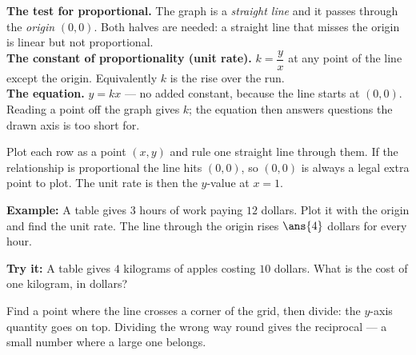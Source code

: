 \documentclass[12pt]{article}
\begin{document}

\begin{formulabox}
\textbf{The test for proportional.} The graph is a \emph{straight line} and it
passes through the \emph{origin} $(0,0)$. Both halves are needed: a straight
line that misses the origin is linear but not proportional.\\[3pt]
\textbf{The constant of proportionality (unit rate).}
$k = \dfrac{y}{x}$ at any point of the line except the origin. Equivalently
$k$ is the rise over the run.\\[3pt]
\textbf{The equation.} $y = kx$ --- no added constant, because the line starts
at $(0,0)$. Reading a point off the graph gives $k$; the equation then answers
questions the drawn axis is too short for.
\end{formulabox}


\begin{formulabox}
Plot each row as a point $(x, y)$ and rule one straight line through them.
If the relationship is proportional the line hits $(0,0)$, so $(0,0)$ is always
a legal extra point to plot. The unit rate is then the $y$-value at $x = 1$.
\end{formulabox}

\begin{examplebox}
\textbf{Example:} A table gives $3$ hours of work paying $12$ dollars. Plot it
with the origin and find the unit rate.
The line through the origin rises $\ans{4}$ dollars for every hour.
\end{examplebox}

\begin{tryitbox}
\textbf{Try it:} A table gives $4$ kilograms of apples costing $10$ dollars.
What is the cost of one kilogram, in dollars?\\[2pt]
\end{tryitbox}


\begin{formulabox}
Find a point where the line crosses a corner of the grid, then divide: the
$y$-axis quantity goes on top. Dividing the wrong way round gives the reciprocal
--- a small number where a large one belongs.
\end{formulabox}
\end{document}
